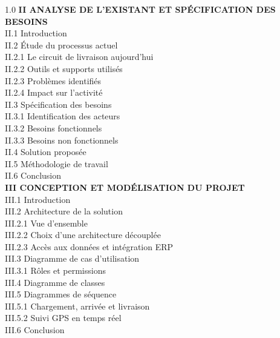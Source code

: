 \documentclass[12pt,a4paper]{report}
\begin{document}
\begin{spacing}{1.0}
\noindent
\textbf{II ANALYSE DE L'EXISTANT ET SPÉCIFICATION DES BESOINS}  \\
\quad II.1 Introduction  \\
\quad II.2 Étude du processus actuel  \\
\quad \quad II.2.1 Le circuit de livraison aujourd'hui  \\
\quad \quad II.2.2 Outils et supports utilisés  \\
\quad \quad II.2.3 Problèmes identifiés  \\
\quad \quad II.2.4 Impact sur l'activité  \\
\quad II.3 Spécification des besoins  \\
\quad \quad II.3.1 Identification des acteurs  \\
\quad \quad II.3.2 Besoins fonctionnels  \\
\quad \quad II.3.3 Besoins non fonctionnels  \\
\quad II.4 Solution proposée  \\
\quad II.5 Méthodologie de travail  \\
\quad II.6 Conclusion  \\

\noindent
\textbf{III CONCEPTION ET MODÉLISATION DU PROJET}  \\
\quad III.1 Introduction  \\
\quad III.2 Architecture de la solution  \\
\quad \quad III.2.1 Vue d'ensemble  \\
\quad \quad III.2.2 Choix d'une architecture découplée  \\
\quad \quad III.2.3 Accès aux données et intégration ERP  \\
\quad III.3 Diagramme de cas d'utilisation  \\
\quad \quad III.3.1 Rôles et permissions  \\
\quad III.4 Diagramme de classes  \\
\quad III.5 Diagrammes de séquence  \\
\quad \quad III.5.1 Chargement, arrivée et livraison  \\
\quad \quad III.5.2 Suivi GPS en temps réel  \\
\quad III.6 Conclusion  \\


\end{spacing}
\end{document}
